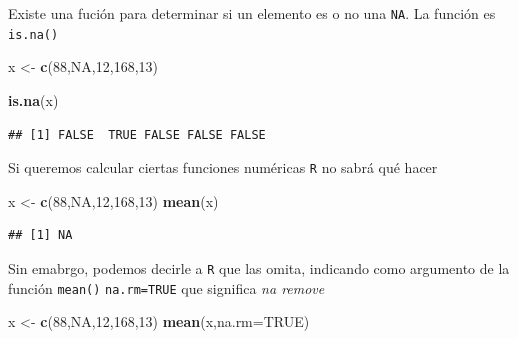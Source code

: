 \documentclass[
]{book}
\newenvironment{Shaded}{\begin{snugshade}}{\end{snugshade}}
\newcommand{\AttributeTok}[1]{\textcolor[rgb]{0.13,0.29,0.53}{#1}}
\newcommand{\ConstantTok}[1]{\textcolor[rgb]{0.56,0.35,0.01}{#1}}
\newcommand{\DecValTok}[1]{\textcolor[rgb]{0.00,0.00,0.81}{#1}}
\newcommand{\FunctionTok}[1]{\textcolor[rgb]{0.13,0.29,0.53}{\textbf{#1}}}
\newcommand{\NormalTok}[1]{#1}
\newcommand{\OtherTok}[1]{\textcolor[rgb]{0.56,0.35,0.01}{#1}}
\begin{document}
Existe una fución para determinar si un elemento es o no una \texttt{NA}. La función es \texttt{is.na()}

\begin{Shaded}
\begin{Highlighting}[]
\NormalTok{x }\OtherTok{\textless{}{-}} \FunctionTok{c}\NormalTok{(}\DecValTok{88}\NormalTok{,}\ConstantTok{NA}\NormalTok{,}\DecValTok{12}\NormalTok{,}\DecValTok{168}\NormalTok{,}\DecValTok{13}\NormalTok{)}
\end{Highlighting}
\end{Shaded}

\begin{Shaded}
\begin{Highlighting}[]
\FunctionTok{is.na}\NormalTok{(x)}
\end{Highlighting}
\end{Shaded}

\begin{verbatim}
## [1] FALSE  TRUE FALSE FALSE FALSE
\end{verbatim}

Si queremos calcular ciertas funciones numéricas \texttt{R} no sabrá qué hacer

\begin{Shaded}
\begin{Highlighting}[]
\NormalTok{x }\OtherTok{\textless{}{-}} \FunctionTok{c}\NormalTok{(}\DecValTok{88}\NormalTok{,}\ConstantTok{NA}\NormalTok{,}\DecValTok{12}\NormalTok{,}\DecValTok{168}\NormalTok{,}\DecValTok{13}\NormalTok{)}
\FunctionTok{mean}\NormalTok{(x)}
\end{Highlighting}
\end{Shaded}

\begin{verbatim}
## [1] NA
\end{verbatim}

Sin emabrgo, podemos decirle a \texttt{R} que las omita, indicando como argumento de la función \texttt{mean()} \texttt{na.rm=TRUE} que significa \emph{na remove}

\begin{Shaded}
\begin{Highlighting}[]
\NormalTok{x }\OtherTok{\textless{}{-}} \FunctionTok{c}\NormalTok{(}\DecValTok{88}\NormalTok{,}\ConstantTok{NA}\NormalTok{,}\DecValTok{12}\NormalTok{,}\DecValTok{168}\NormalTok{,}\DecValTok{13}\NormalTok{)}
\FunctionTok{mean}\NormalTok{(x,}\AttributeTok{na.rm=}\ConstantTok{TRUE}\NormalTok{)}
\end{Highlighting}
\end{Shaded}
\end{document}
